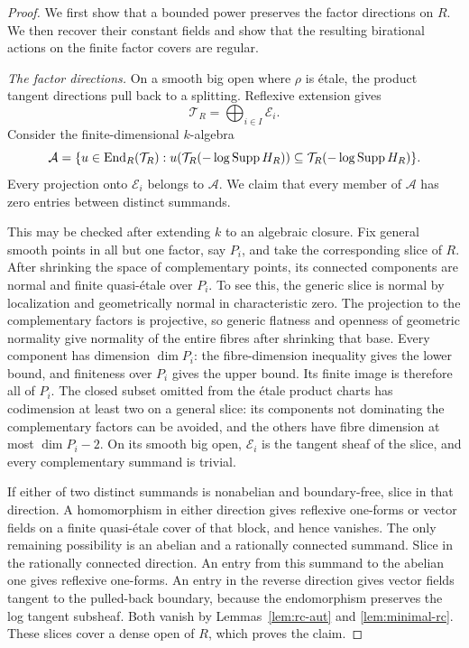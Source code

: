 \begin{proof}
We first show that a bounded power preserves the factor directions on $R$.
We then recover their constant fields and show that the resulting
birational actions on the finite factor covers are regular.

\smallskip\noindent\emph{The factor directions.}
On a smooth big open where $\rho$ is \'etale, the product tangent
directions pull back to a splitting.  Reflexive extension gives
\[
                    \mathcal T_R=\bigoplus_{i\in I}\mathcal E_i.
\]
Consider the finite-dimensional $k$-algebra
\[
 \mathcal A=
 \{u\in\operatorname{End}_R(\mathcal T_R):
 u(\mathcal T_R(-\log\operatorname{Supp} H_R))
       \subseteq\mathcal T_R(-\log\operatorname{Supp} H_R)\}.
\]
Every projection onto $\mathcal E_i$ belongs to $\mathcal A$.
We claim that every member of $\mathcal A$ has zero entries
between distinct summands.

This may be checked after extending $k$ to an algebraic closure.
Fix general smooth points in all but one factor, say $P_i$, and
take the corresponding slice of $R$.  After shrinking the space of
complementary points, its connected components are normal and
finite quasi-\'etale over $P_i$.  To see this, the generic slice is
normal by localization and geometrically normal in characteristic
zero.  The projection to the complementary factors is projective,
so generic flatness and openness of geometric normality give
normality of the entire fibres after shrinking that base.  Every
component has dimension $\dim P_i$:
the fibre-dimension inequality gives the lower bound, and finiteness
over $P_i$ gives the upper bound.  Its finite image is therefore all
of $P_i$.  The closed subset omitted from the \'etale product
charts has codimension at least two on a general slice: its
components not dominating the complementary factors can be avoided,
and the others have fibre dimension at most $\dim P_i-2$.
On its smooth big open, $\mathcal E_i$ is the tangent sheaf of
the slice, and every complementary summand is trivial.

If either of two distinct summands is nonabelian and boundary-free,
slice in that direction.  A homomorphism in either direction gives
reflexive one-forms or vector fields on a finite quasi-\'etale
cover of that block, and hence vanishes.  The only remaining
possibility is an abelian and a rationally connected summand.
Slice in the rationally connected direction.  An entry from this
summand to the abelian one gives reflexive one-forms.  An entry in
the reverse direction gives vector fields tangent to the pulled-back
boundary, because the endomorphism preserves the log tangent
subsheaf.  Both vanish by Lemmas~\ref{lem:rc-aut} and
\ref{lem:minimal-rc}.  These slices cover a dense open of $R$,
which proves the claim.


\end{proof}

